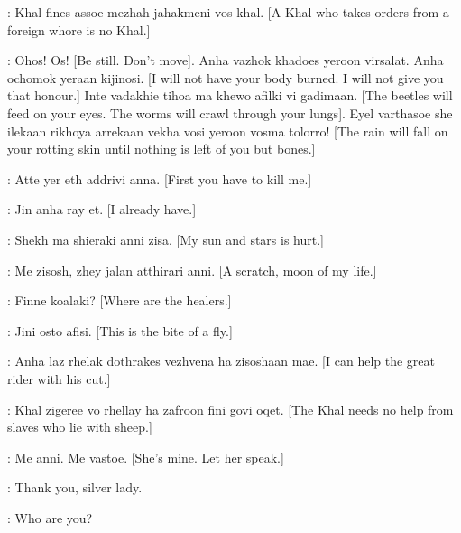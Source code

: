 \MAGO:  Khal fines assoe mezhah jahakmeni vos khal. [A Khal who takes orders from a foreign whore is no Khal.] 


\DROGO: Ohos! Os! [Be still. Don't move].  Anha vazhok khadoes yeroon virsalat. Anha ochomok yeraan kijinosi. [I will not have your body burned. I will not give you that honour.]  Inte vadakhie tihoa ma khewo afilki vi gadimaan. [The beetles will feed on your eyes. The worms will crawl through your lungs].  Eyel varthasoe she ilekaan rikhoya arrekaan vekha vosi yeroon vosma tolorro! [The rain will fall on your rotting skin until nothing is left of you but bones.] 


\MAGO: Atte yer eth addrivi anna. [First you have to kill me.] 

\DROGO: Jin anha ray et. [I already have.]


\DAENERYS:  Shekh ma shieraki anni zisa. [My sun and stars is hurt.] 

\DROGO: Me zisosh, zhey jalan atthirari anni. [A scratch, moon of my life.] 

\DAENERYS: Finne koalaki? [Where are the healers.] 

\DROGO: Jini osto afisi. [This is the bite of a fly.] 

\MIRRI: Anha laz rhelak dothrakes vezhvena ha zisoshaan mae. [I can help the great rider with his cut.] 

\QOTHO: Khal zigeree vo rhellay ha zafroon fini govi oqet. [The Khal needs no help from slaves who lie with sheep.] 

\DAENERYS: Me anni. Me vastoe. [She's mine. Let her speak.] 

\MIRRI: Thank you, silver lady. 

\DAENERYS: Who are you? 

